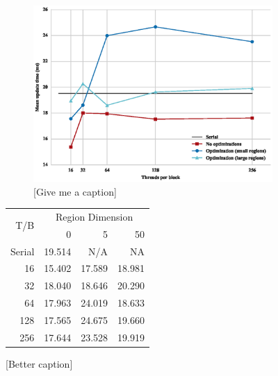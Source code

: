 \documentclass[onecolumn,12pt]{IEEEtran}
\begin{document}
  \begin{figure}[t]
    \centering
    \begin{subfigure}[t]{0.3\textwidth}
    \includegraphics[width=1\textwidth]{../images/plot.eps}
      \caption{[Give me a caption]}
      \label{fig:comparison}  
    \end{subfigure}
    \begin{subtable}[t]{0.4\textwidth}
      \centering
        \begin{tabular}{@{}*{4}{r}@{}} \toprule
          \multirow{2}{*}{T/B} 
          & \multicolumn{3}{c}{Region Dimension} \\
                           & 0        & 5       & 50 \\ \midrule 
          Serial           &  19.514  &  N/A    & NA \\
          16               &  15.402  &  17.589 &  18.981 \\
          32               &  18.040  &  18.646 &  20.290 \\
          64               &  17.963  &  24.019 &  18.633 \\
          128              &  17.565  &  24.675 &  19.660 \\
          256              &  17.644  &  23.528 & 19.919 \\ \bottomrule
      \end{tabular}
      \caption{[Better caption]}
      \label{tab:means}
    \end{subtable}

  \end{figure}
\end{document}
